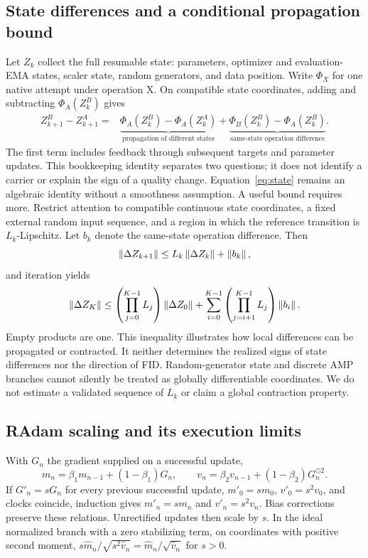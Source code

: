 \subsection{State differences and a conditional propagation bound}
\label{app:propagation}
Let $Z_k$ collect the full resumable state: parameters, optimizer and evaluation-EMA states, scaler state, random generators, and data position. Write $\Phi_X$ for one native attempt under operation X. On compatible state coordinates, adding and subtracting $\Phi_A(Z_k^B)$ gives
\begin{align}
 Z^B_{k+1}-Z^A_{k+1}
 =&\underbrace{\Phi_A(Z^B_k)-\Phi_A(Z^A_k)}_{\text{propagation of different states}}
 +\underbrace{\Phi_B(Z^B_k)-\Phi_A(Z^B_k)}_{\text{same-state operation difference}}.
 \label{eq:state}
\end{align}
The first term includes feedback through subsequent targets and parameter updates. This bookkeeping identity separates two questions; it does not identify a carrier or explain the sign of a quality change. Equation~\ref{eq:state} remains an algebraic identity without a smoothness assumption. A useful bound requires more. Restrict attention to compatible continuous state coordinates, a fixed external random input sequence, and a region in which the reference transition is $L_k$-Lipschitz. Let $b_k$ denote the same-state operation difference. Then
\begin{equation}
 \left\lVert\Delta Z_{k+1}\right\rVert\leq L_k\left\lVert\Delta Z_k\right\rVert+\left\lVert b_k\right\rVert,
\end{equation}
and iteration yields
\begin{equation}
 \left\lVert\Delta Z_K\right\rVert\leq
 \left(\prod_{j=0}^{K-1}L_j\right)\left\lVert\Delta Z_0\right\rVert
 +\sum_{i=0}^{K-1}\left(\prod_{j=i+1}^{K-1}L_j\right)\left\lVert b_i\right\rVert.
 \label{eq:bound}
\end{equation}
Empty products are one. This inequality illustrates how local differences can be propagated or contracted. It neither determines the realized signs of state differences nor the direction of FID. Random-generator state and discrete AMP branches cannot silently be treated as globally differentiable coordinates. We do not estimate a validated sequence of $L_k$ or claim a global contraction property.

\subsection{RAdam scaling and its execution limits}
With $G_n$ the gradient supplied on a successful update,
\begin{equation}
 m_n=\beta_1m_{n-1}+(1-\beta_1)G_n,\qquad
 v_n=\beta_2v_{n-1}+(1-\beta_2)G_n^{\odot2}.
\end{equation}
If $G'_n=sG_n$ for every previous successful update, $m'_0=sm_0$, $v'_0=s^2v_0$, and clocks coincide, induction gives $m'_n=sm_n$ and $v'_n=s^2v_n$. Bias corrections preserve these relations. Unrectified updates then scale by $s$. In the ideal normalized branch with a zero stabilizing term, on coordinates with positive second moment, $s\widehat m_n/\sqrt{s^2\widehat v_n}=\widehat m_n/\sqrt{\widehat v_n}$ for $s>0$.

